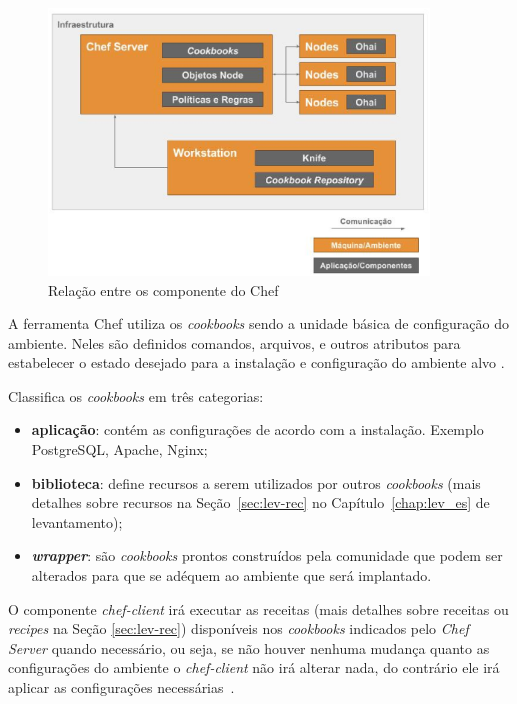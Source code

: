 \begin{figure}[]
  \centering
  \includegraphics[width=0.9\textwidth]{figuras/chef-comp.eps}
  \caption{Relação entre os componente do Chef}
  \label{fig:chef-comp}
\end{figure}

A ferramenta Chef utiliza os \textit{cookbooks} sendo a unidade básica de configuração do
ambiente. Neles são definidos comandos, arquivos, e outros atributos
para estabelecer o estado desejado para a instalação e configuração
do ambiente alvo \cite{sharma:2015}.

 Classifica os \textit{cookbooks} em três categorias:
\begin{itemize}
  \item \textbf{aplicação}: contém as configurações de acordo com a instalação.
    Exemplo PostgreSQL, Apache, Nginx;
  \item \textbf{biblioteca}: define recursos a serem utilizados por outros \textit{cookbooks}
    (mais detalhes sobre recursos na Seção~\ref{sec:lev-rec} no Capítulo~\ref{chap:lev_es} de levantamento);
  \item \textbf{\textit{wrapper}}: são \textit{cookbooks} prontos construídos pela comunidade que podem
    ser alterados para que se adéquem ao ambiente que será implantado.
\end{itemize}

O componente \textit{chef-client} irá executar as receitas (mais detalhes sobre receitas ou
\textit{recipes} na Seção \ref{sec:lev-rec}) disponíveis nos \textit{cookbooks}
indicados pelo \textit{Chef Server} quando necessário, ou seja, se não houver
nenhuma mudança quanto as configurações do ambiente o \textit{chef-client} não irá
alterar nada, do contrário ele irá aplicar as configurações necessárias~\cite{chefdoc:2016}.

